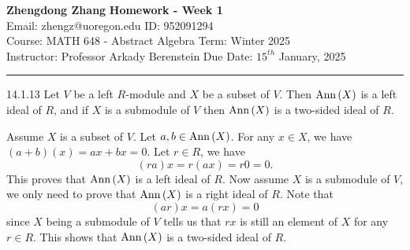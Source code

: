 \documentclass[a4paper, 12pt]{article}
\begin{document}
\noindent
\large\textbf{Zhengdong Zhang} \hfill \textbf{Homework - Week 1}   \\
Email: zhengz@uoregon.edu \hfill ID: 952091294 \\
\normalsize Course: MATH 648 - Abstract Algebra  \hfill Term: Winter 2025\\
Instructor: Professor Arkady Berenstein \hfill Due Date: $15^{th}$ January, 2025 \\
\noindent\rule{7in}{2.8pt}
\begin{problem}{14.1.13}
Let \(V\) be a left \(R\)-module and \(X\) be a subset of \(V\). Then \(\text{Ann}\,(X)\) is a left ideal of \(R\), and if \(X\) is a submodule of \(V\) then \(\text{Ann}\,(X)\) is a two-sided ideal of \(R\).
\end{problem}
\begin{solution}
Assume \(X\) is a subset of \(V\). Let \(a,b\in \text{Ann}\,(X)\). For any \(x\in X\), we have \((a+b)(x)=ax+bx=0\). Let \(r\in R\), we have 
\[(ra)x=r(ax)=r0=0.\]
This proves that \(\text{Ann}\,(X)\) is a left ideal of \(R\). Now assume \(X\) is a submodule of \(V\), we only need to prove that \(\text{Ann}\,(X)\) is a right ideal of \(R\). Note that 
\[(ar)x=a(rx)=0\]
since \(X\) being a submodule of \(V\) tells us that \(rx\) is still an element of \(X\) for any \(r\in R\). This shows that \(\text{Ann}\,(X)\) is a two-sided ideal of \(R\).   
\end{solution}
\end{document}
